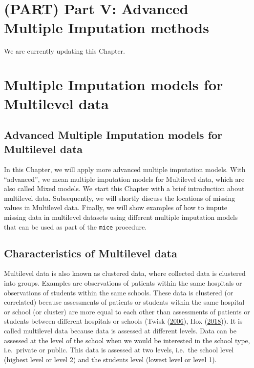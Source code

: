 \documentclass[
]{book}
\begin{document}
\hypertarget{part-part-v-advanced-multiple-imputation-methods}{%
\chapter*{(PART) Part V: Advanced Multiple Imputation
methods}\label{part-part-v-advanced-multiple-imputation-methods}}

We are currently updating this Chapter.

\hypertarget{multiple-imputation-models-for-multilevel-data}{%
\chapter{Multiple Imputation models for Multilevel
data}\label{multiple-imputation-models-for-multilevel-data}}

\hypertarget{advanced-multiple-imputation-models-for-multilevel-data}{%
\section{Advanced Multiple Imputation models for Multilevel
data}\label{advanced-multiple-imputation-models-for-multilevel-data}}

In this Chapter, we will apply more advanced multiple imputation models.
With ``advanced'', we mean multiple imputation models for Multilevel
data, which are also called Mixed models. We start this Chapter with a
brief introduction about multilevel data. Subsequently, we will shortly
discuss the locations of missing values in Multilevel data. Finally, we
will show examples of how to impute missing data in multilevel datasets
using different multiple imputation models that can be used as part of
the \texttt{mice} procedure.

\hypertarget{characteristics-of-multilevel-data}{%
\section{Characteristics of Multilevel
data}\label{characteristics-of-multilevel-data}}

Multilevel data is also known as clustered data, where collected data is
clustered into groups. Examples are observations of patients within the
same hospitals or observations of students within the same schools.
These data is clustered (or correlated) because assessments of patients
or students within the same hospital or school (or cluster) are more
equal to each other than assessments of patients or students between
different hospitals or schools (Twisk
(\protect\hyperlink{ref-twisk2006appliedmultilevelanalysis}{2006}), Hox
(\protect\hyperlink{ref-hox2018multilevelanalysis}{2018})). It is called
multilevel data because data is assessed at different levels. Data can
be assessed at the level of the school when we would be interested in
the school type, i.e.~private or public. This data is assessed at two
levels, i.e.~the school level (highest level or level 2) and the
students level (lowest level or level 1).
\end{document}
